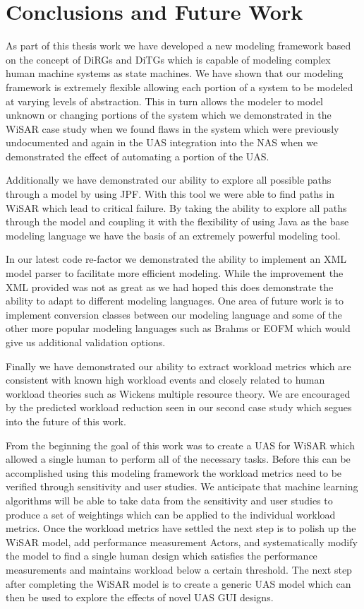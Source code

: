 \chapter{Conclusions and Future Work}

As part of this thesis work we have developed a new modeling framework based on the concept of DiRGs and DiTGs which is capable of modeling complex human machine systems as state machines.  We have shown that our modeling framework is extremely flexible allowing each portion of a system to be modeled at varying levels of abstraction.  This in turn allows the modeler to model unknown or changing portions of the system which we demonstrated in the WiSAR case study when we found flaws in the system which were previously undocumented and again in the UAS integration into the NAS when we demonstrated the effect of automating a portion of the UAS.  

Additionally we have demonstrated our ability to explore all possible paths through a model by using JPF.  With this tool we were able to find paths in WiSAR which lead to critical failure.  By taking the ability to explore all paths through the model and coupling it with the flexibility of using Java as the base modeling language we have the basis of an extremely powerful modeling tool.

In our latest code re-factor we demonstrated the ability to implement an XML model parser to facilitate more efficient modeling.  While the improvement the XML provided was not as great as we had hoped this does demonstrate the ability to adapt to different modeling languages.  One area of future work is to implement conversion classes between our modeling language and some of the other more popular modeling languages such as Brahms or EOFM which would give us additional validation options.

Finally we have demonstrated our ability to extract workload metrics which are consistent with known high workload events and closely related to human workload theories such as Wickens multiple resource theory.  We are encouraged by the predicted workload reduction seen in our second case study which segues into the future of this work.

From the beginning the goal of this work was to create a UAS for WiSAR which allowed a single human to perform all of the necessary tasks.  Before this can be accomplished using this modeling framework the workload metrics need to be verified through sensitivity and user studies.  We anticipate that machine learning algorithms will be able to take data from the sensitivity and user studies to produce a set of weightings which can be applied to the individual workload metrics.  Once the workload metrics have settled the next step is to polish up the WiSAR model, add performance measurement Actors, and systematically modify the model to find a single human design which satisfies the performance measurements and maintains workload below a certain threshold.  The next step after completing the WiSAR model is to create a generic UAS model which can then be used to explore the effects of novel UAS GUI designs.

